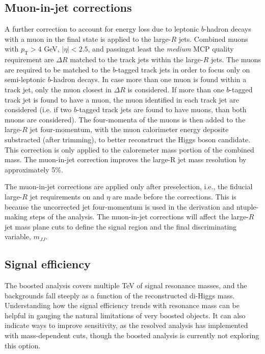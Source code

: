 \subsection{Muon-in-jet corrections}

A further correction to account for energy loss due to leptonic $b$-hadron decays with a muon in the final state is applied to the large-$R$ jets. Combined muons with $p_\text{T} > 4$ GeV, $|\eta| < 2.5$, and passingat least the \textit{medium} MCP quality requirement are $\Delta R$ matched to the track jets within the large-$R$ jets.  The muons are required to be matched to the $b$-tagged track jets in order to focus only on semi-leptonic $b$-hadron decays.  In case more than one muon is found within a track jet, only the muon closest in $\Delta R$ is considered.  If more than one $b$-tagged track jet is found to have a muon,  the muon identified in each track jet are considered (i.e. if two $b$-tagged track jets are found to have muons, than both muons are considered). The four-momenta of the muons is then added to the large-$R$ jet four-momentum, with the muon calorimeter energy deposite substracted (after trimming), to better reconstruct the Higgs boson candidate. This correction is only applied to the caloremeter mass portion of the combined mass. The muon-in-jet correction improves the large-R jet mass resolution by approximately 5\%.

The muon-in-jet corrections are applied only after preselection, i.e., the fiducial large-$R$ jet requirements on \pt and $\eta$ are made before the corrections. This is because the uncorrected jet four-momentum is used in the derivation and ntuple-making steps of the analysis. The muon-in-jet corrections will affect the large-$R$ jet mass plane cuts to define the signal region and the final discriminating variable, $m_{JJ}$.


\subsection{Signal efficiency}

The boosted analysis covers multiple TeV of signal resonance masses, and the backgrounds fall steeply as a function of the reconstructed di-Higgs mass. Understanding how the signal efficiency trends with resonance mass can be helpful in gauging the natural limitations of very boosted objects. It can also indicate ways to improve sensitivity, as the resolved analysis has implemented with mass-dependent cuts, though the boosted analysis is currently not exploring this option.

